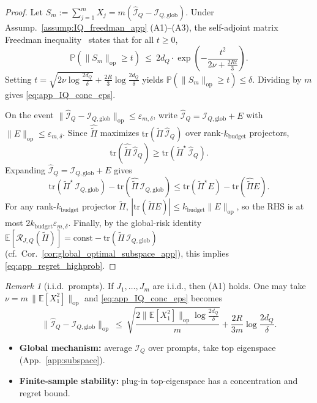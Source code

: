 \documentclass{article}
\theoremstyle{plain}
\theoremstyle{definition}
\theoremstyle{remark}
\newtheorem{remark}[theorem]{Remark}
\begin{document}
\begin{proof}
Let $S_m:=\sum_{j=1}^m X_j = m(\widehat{\mathcal I}_Q-\mathcal I_{Q,\mathrm{glob}})$.
Under Assump.~\ref{assump:IQ_freedman_app} (A1)--(A3), the self-adjoint matrix Freedman inequality~\citep{Tropp2012MatrixBernstein} states
that for all $t\ge 0$,
\[
\mathbb P\!\left(\|S_m\|_{\mathrm{op}}\ge t\right)
\ \le\
2d_Q\cdot \exp\!\left(
-\frac{t^2}{2\nu+\frac{2Rt}{3}}
\right).
\]
Setting
$
t=\sqrt{2\nu\log\frac{2d_Q}{\delta}}+\frac{2R}{3}\log\frac{2d_Q}{\delta}
$
yields $\mathbb P(\|S_m\|_{\mathrm{op}}\ge t)\le \delta$.
Dividing by $m$ gives \eqref{eq:app_IQ_conc_eps}.


On the event $\|\widehat{\mathcal I}_Q-\mathcal I_{Q,\mathrm{glob}}\|_{\mathrm{op}}\le \varepsilon_{m,\delta}$,
write $\widehat{\mathcal I}_Q=\mathcal I_{Q,\mathrm{glob}}+E$ with $\|E\|_{\mathrm{op}}\le \varepsilon_{m,\delta}$.
Since $\widehat{\widetilde\Pi}$ maximizes $\mathrm{tr}(\widetilde\Pi\,\widehat{\mathcal I}_Q)$ over rank-$k_{\text{budget}}$
projectors,
\[
\mathrm{tr}(\widehat{\widetilde\Pi}\,\widehat{\mathcal I}_Q)
\ge
\mathrm{tr}(\widetilde\Pi^\star\,\widehat{\mathcal I}_Q).
\]
Expanding $\widehat{\mathcal I}_Q=\mathcal I_{Q,\mathrm{glob}}+E$ gives
\[
\mathrm{tr}(\widetilde\Pi^\star\,\mathcal I_{Q,\mathrm{glob}})
-
\mathrm{tr}(\widehat{\widetilde\Pi}\,\mathcal I_{Q,\mathrm{glob}})
\le
\mathrm{tr}(\widetilde\Pi^\star E)-\mathrm{tr}(\widehat{\widetilde\Pi}E).
\]
For any rank-$k_{\text{budget}}$ projector $\widetilde\Pi$,
$|\mathrm{tr}(\widetilde\Pi E)|\le k_{\text{budget}}\|E\|_{\mathrm{op}}$,
so the RHS is at most $2k_{\text{budget}}\varepsilon_{m,\delta}$.
Finally, by the global-risk identity
$\mathbb E[\mathcal R_{J,Q}(\widetilde\Pi)]
=\text{const}-\mathrm{tr}(\widetilde\Pi\,\mathcal I_{Q,\mathrm{glob}})$
(cf.\ Cor.~\ref{cor:global_optimal_subspace_app}),
this implies \eqref{eq:app_regret_highprob}.
\end{proof}


\begin{remark}[i.i.d.\ prompts]
If $J_1,\dots,J_m$ are i.i.d., then (A1) holds. One may take
$\nu = m\,\bigl\|\mathbb E[X_1^2]\bigr\|_{\mathrm{op}}$
and \eqref{eq:app_IQ_conc_eps} becomes
\[
\bigl\|\widehat{\mathcal I}_Q-\mathcal I_{Q,\mathrm{glob}}\bigr\|_{\mathrm{op}}
\ \le\
\sqrt{\frac{2\bigl\|\mathbb E[X_1^2]\bigr\|_{\mathrm{op}}\log\frac{2d_Q}{\delta}}{m}}
+
\frac{2R}{3m}\log\frac{2d_Q}{\delta}.
\]
\end{remark}


\begin{takeawaybox}[title=\textbf{Summary: Subspace design can be learned globally}]
\begin{itemize}[leftmargin=*, itemsep=0pt, topsep=0pt]
\item \textbf{Global mechanism:} average $\mathcal I_Q$ over prompts, take top eigenspace (App.~\ref{app:subspace}).
\item \textbf{Finite-sample stability:} plug-in top-eigenspace has a concentration and regret bound.
\end{itemize}
\end{takeawaybox}
\end{document}
